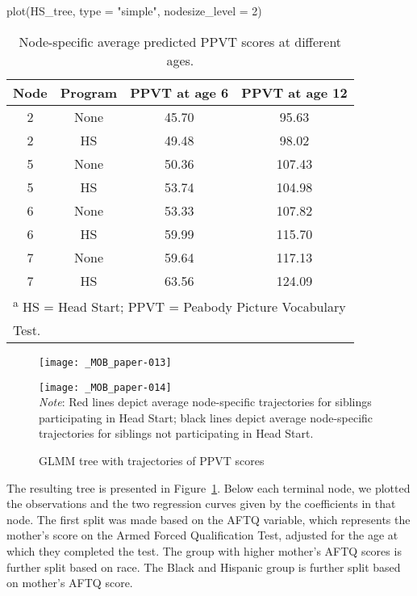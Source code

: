 \documentclass[doc,floatsintext,natbib]{apa7}
\begin{document}
\begin{Schunk}
\begin{Sinput}
 plot(HS_tree, type = "simple", nodesize_level = 2)
\end{Sinput}
\end{Schunk}


\begin{table}

\caption{\label{tab:predictions}Node-specific average predicted PPVT scores at different ages.}
\begin{tabular}[t]{cccc}
\toprule
Node & Program & PPVT at age 6 & PPVT at age 12\\
\midrule
2 & None & 45.70 & 95.63\\
2 & HS & 49.48 & 98.02\\
5 & None & 50.36 & 107.43\\
5 & HS & 53.74 & 104.98\\
6 & None & 53.33 & 107.82\\
6 & HS & 59.99 & 115.70\\
7 & None & 59.64 & 117.13\\
7 & HS & 63.56 & 124.09\\
\bottomrule
\multicolumn{4}{l}{\textsuperscript{a} HS = Head Start; PPVT = Peabody Picture Vocabulary}\\
\multicolumn{4}{l}{Test.}\\
\end{tabular}
\end{table}
\FloatBarrier

\begin{figure}%
\caption{GLMM tree with trajectories of PPVT scores}
\texttt{[image: \_MOB\_paper-013]}

\vspace*{-3cm}

\texttt{[image: \_MOB\_paper-014]}
\\\textit{Note}: Red lines depict average node-specific trajectories for siblings participating in Head Start; black lines depict average node-specific trajectories for siblings not participating in Head Start.
\label{fig:lmm_tree}
\end{figure}%

The resulting tree is presented in Figure~\ref{fig:lmm_tree}. Below each terminal node, we plotted the observations and the two regression curves given by the coefficients in that node. The first split was made based on the AFTQ variable, which represents the mother's score on the Armed Forced Qualification Test, adjusted for the age at which they completed the test. The group with higher mother's AFTQ scores is further split based on race. The Black and Hispanic group is further split based on mother's AFTQ score. 
\end{document}
